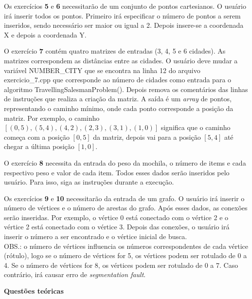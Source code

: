\documentclass[12pt,a4paper]{article}
\begin{document}
Os exercícios \textbf{5} e \textbf{6} necessitarão de um conjunto de pontos cartesianos. O usuário irá inserir todos os pontos. Primeiro irá especificar o número de pontos a serem inseridos, sendo necessário ser maior ou igual a 2. Depois insere-se a coordenada X e depois a coordenada Y. 

O exercício \textbf{7} contém quatro matrizes de entradas (3, 4, 5 e 6 cidades). As matrizes correspondem as distâncias entre as cidades. O usuário deve mudar a variável \textsf{NUMBER\_CITY} que se encontra na linha 12 do arquivo \textsf{exercicio\_7.cpp} que corresponde ao número de cidades como entrada para o algoritmo \textsf{TravellingSalesmanProblem()}. Depois remova os comentários das linhas de instruções que realiza a criação da matriz. A saída é um \textit{array} de pontos, representando o caminho mínimo, onde cada ponto corresponde a posição da matriz. Por exemplo, o caminho $[(0,5),(5,4),(4,2),(2,3),(3,1),(1,0)]$ significa que o caminho começa com a posição $[0,5]$ da matriz, depois vai para a posição $[5,4]$ até chegar a última posição $[1,0]$.

O exercício \textbf{8} necessita da entrada do peso da mochila, o número de items e cada respectivo peso e valor de cada item. Todos esses dados serão inseridos pelo usuário. Para isso, siga as instruções durante a execução.

Os exercícios \textbf{9} e \textbf{10} necessitarão da entrada de um grafo. O usuário irá inserir o número de vértices e o número de arestas do grafo. Após esses dados, as conexões serão inseridas. Por exemplo, o vértice 0 está conectado com o vértice 2 e o vértice 2 está conectado com o vértice 3. Depois das conexões, o usuário irá inserir o número a ser encontrado e o vértice inicial de busca. \\
OBS.: o número de vértices influencia os números correspondentes de cada vértice (rótulo), logo se o número de vértices for 5, os vértices podem ser rotulado de 0 a 4. Se o número de vértices for 8, os vértices podem ser rotulado de 0 a 7. Caso contrário, irá causar erro de \textit{segmentation fault}.





\vspace{1cm}

{\Large \textbf{Questões teóricas}}
\end{document}
